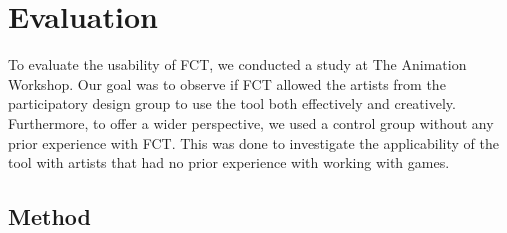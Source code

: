 \section{Evaluation}


To evaluate the usability of FCT, we conducted a study at The Animation Workshop. Our goal was to observe if FCT allowed the artists from the participatory design group to use the tool both effectively and creatively. Furthermore, to offer a wider perspective, we used a control group without any prior experience with FCT. This was done to investigate the applicability of the tool with artists that had no prior experience with working with games.


\subsection{Method} \label{method}







